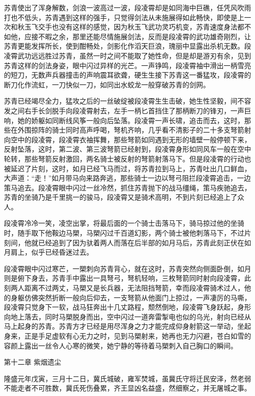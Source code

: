 苏青使出了浑身解数，剑浪一波高过一波，段凌霄却是如同海中巨礁，任凭风吹雨打也不低头，苏青遇到这样的强手，只觉得剑法从未施展得如此畅快，即使是上一次和秋玉飞交手也没有这样的感觉，因为秋玉飞武功灵巧机变，苏青速度身法都不如他，应接不暇之余，那里还能尽情施展剑法，反而是段凌霄的武功雄奇刚烈，让苏青更能发挥所长，使到酣畅处，剑影化作滔天巨浪，瑰丽中显露出杀机无数。段凌霄武功远远胜过苏青，虽然一时之间不能取了她性命，但是却是游刃有余，见到苏青这样的剑法身姿，眼中闪过异样的光芒。一声铮鸣，段凌霄袖中滑出一柄雪亮的短刀，无数声兵器撞击的声响震耳欲聋，硬生生接下苏青这一番猛攻，段凌霄的断刀化作流虹，一刀快似一刀，如同出水蛟龙一般穿破苏青的剑网。

苏青已经竭尽全力，猛攻之后的一丝破绽被段凌霄生生击破，她生性坚毅，间不容发之间右手长剑脱手向段凌霄射去，左手一柄匕首挡住了那柄断刀的锋刃，一声巨响，她的娇躯如同断线风筝一般向后坠落。段凌霄一声长啸，追击而去，这时，那些在外围掠阵的骑士同时高声呼喝，弩机齐响，几乎看不清影子的二十多支弩箭射向空中的段凌霄，段凌霄衣袖挥舞，那些弩箭如同遇到无形的墙壁一般停顿下来，反射坠落，这时，第二波、第三波弩箭已经射到，段凌霄身形如同风车一般在空中轮转，那些弩箭反射激回，两名骑士被反射的弩箭射落马下。但是段凌霄的行动也被延迟了片刻，这时，如月已经飞马而过，将苏青拉到马上，苏青吐出几口鲜血，大声道：“走！”如月带马向来路奔逃，那些骑士一边以弩弓阻拦段凌霄追击，一边策马追去。段凌霄眼中闪过一丝冷然，抓住苏青抛下的战马缰绳，策马疾驰追去，苏青的坐骑乃是千里挑一的骏马，段凌霄又是骑术高明，不到片刻已经追上了众人。

段凌霄冷冷一笑，凌空出掌，将最后面的一个骑士击落马下，骑马掠过他的坐骑时，随手取下他鞍边马槊，马槊闪过千百道幻影，两个骑士被他刺落马下，不过片刻间，他就已经追到了因为驮着两人而落在后半部的如月马后，苏青此刻正伏在如月肩上，似乎已经昏迷过去。

段凌霄眼中闪过寒芒，一槊刺向苏青背心，就在这时，苏青突然向侧面卧倒，如月则是俯下身去，苏青手中露出一具弩弓，弩机轻响，三枚弩箭同时射向段凌霄，此刻两人距离不过两丈，马槊又是长兵器，无法阻挡弩箭，幸而段凌霄骑术过人，他的身躯仿佛突然折断一般向后仰去，一支弩箭从他面门上掠过，一声凄厉的马嘶，段凌霄只觉身下一软，战马狂奔出十几丈路程，颓然倒地，段凌霄飞身跃起，身形向地上落去，同时马槊脱身而出，空中闪过一道奔雷掣电也似的乌光，射向已经从马上起身的苏青。苏青方才已经是用尽浑身之力才能完成仰身射箭这一举动，坐起身来，正是手足虚软有心无力之时，见到马槊射来，她再也无力闪避，苍白如雪的容颜上露出一丝令人心寒的微笑，她宁静的等待着马槊刺入自己胸口的瞬间。

第十二章    紫烟遗尘

隆盛元年戊寅，三月十二日，冀氏城破，雍军焚城，虽冀氏守将迁民安泽，然老弱不能走者不可胜数，冀氏死伤叠累，齐王显凶名益盛，然细察之，并无屠城之事。

